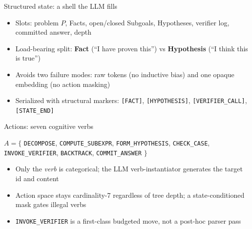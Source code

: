 \documentclass[aspectratio=169]{beamer}
\newcommand{\verbword}[1]{\texttt{#1}}
\begin{document}
\begin{frame}{Structured state: a shell the LLM fills}
  \begin{itemize}
    \item Slots: problem $P$, Facts, open/closed Subgoals, Hypotheses, verifier log, committed answer, depth
    \item Load-bearing split: \textbf{Fact} (``I have proven this'') vs \textbf{Hypothesis} (``I think this is true'')
    \item Avoids two failure modes: raw tokens (no inductive bias) and one opaque embedding (no action masking)
    \item Serialized with structural markers: \verbword{[FACT]}, \verbword{[HYPOTHESIS]}, \verbword{[VERIFIER\_CALL]}, \verbword{[STATE\_END]}
  \end{itemize}
\end{frame}

\begin{frame}{Actions: seven cognitive verbs}
  \begin{block}{$A = \{$ \verbword{DECOMPOSE}, \verbword{COMPUTE\_SUBEXPR}, \verbword{FORM\_HYPOTHESIS}, \verbword{CHECK\_CASE}, \verbword{INVOKE\_VERIFIER}, \verbword{BACKTRACK}, \verbword{COMMIT\_ANSWER} $\}$}
  \end{block}
  \begin{itemize}
    \item Only the \emph{verb} is categorical; the LLM verb-instantiator generates the target id and content
    \item Action space stays cardinality-7 regardless of tree depth; a state-conditioned mask gates illegal verbs
    \item \verbword{INVOKE\_VERIFIER} is a first-class budgeted move, not a post-hoc parser pass
  \end{itemize}
\end{frame}
\end{document}
